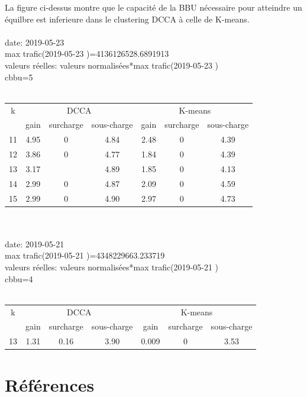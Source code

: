 \documentclass{report}
\begin{document}
La figure ci-dessus montre que le capacité de la BBU nécessaire pour atteindre un équilbre est inferieure dans le clustering DCCA 
à celle de K-means. 
\\\\
date: 2019-05-23\\
max trafic(2019-05-23 )=4136126528.6891913 \\
valeurs réelles: valeurs normalisées*max trafic(2019-05-23 )\\
cbbu=5\\\\
\begin{tabular}{|c|c|c|c|c|c|c|}
\hline
k & \multicolumn{3}{c|}{DCCA} & \multicolumn{3}{c|}{K-means}\\ 
\cline{2-6} 
        & gain & surcharge & sous-charge  & gain & surcharge & sous-charge  \\   
\hline
11 & 4.95 & 0 & 4.84 & 2.48 & 0 & 4.39 \\
\hline
12 & 3.86 & 0 & 4.77 & 1.84 & 0 & 4.39 \\
\hline
13 & 3.17 &  & 4.89 & 1.85 & 0 & 4.13\\
\hline
14 & 2.99 & 0 & 4.87 & 2.09 & 0 & 4.59\\
\hline
15 & 2.99 & 0 & 4.90 & 2.97 & 0 & 4.73 \\
\hline
\end{tabular}
\\\\
date: 2019-05-21\\
max trafic(2019-05-21 )=4348229663.233719 \\
valeurs réelles: valeurs normalisées*max trafic(2019-05-21 )\\
cbbu=4\\\\
\begin{tabular}{|c|c|c|c|c|c|c|}
\hline
k & \multicolumn{3}{c|}{DCCA} & \multicolumn{3}{c|}{K-means}\\ 
\cline{2-6} 
        & gain & surcharge & sous-charge  & gain & surcharge & sous-charge  \\   
\hline
13 & 1.31 & 0.16 & 3.90 & 0.009 & 0 & 3.53 \\
\hline
\end{tabular}

 
\chapter*{Références}
\end{document}
